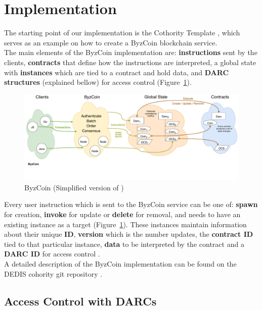 \section{Implementation} \label{Implementation}

The starting point of our implementation is the Cothority Template \cite{Template}, which serves as an example on how to create a ByzCoin \cite{ByzCoin} blockchain service.\\
\newline
The main elements of the ByzCoin implementation are: \textbf{instructions} sent by the clients, \textbf{contracts} that define how the instructions are interpreted, a global state with \textbf{instances} which are tied to a contract and hold data, and \textbf{DARC structures} (explained bellow) for access control (Figure~\ref{ByzCoin simplified}).
\begin{figure}[H]
    \centering
    \includegraphics[width=1\textwidth]{Figures/ByzCoin_simplified.pdf}
    \vspace{-40pt}
    \caption{ByzCoin (Simplified version of \cite{ByzCoin Figure})}
    \label{ByzCoin simplified}
\end{figure}
\noindent
Every user instruction which is sent to the ByzCoin service can be one of: \textbf{spawn} for creation, \textbf{invoke} for update or \textbf{delete} for removal, and needs to have an existing instance as a target (Figure~\ref{ByzCoin simplified}). These instances maintain information about their unique \textbf{ID}, \textbf{version} which is the number updates, the \textbf{contract ID} tied to that particular instance, \textbf{data} to be interpreted by the contract and a \textbf{DARC ID} for access control \cite{Contracts}.\\
\newline
A detailed description of the ByzCoin implementation can be found on the DEDIS cohority git repository \cite{ByzCoin Impl}.

\subsection{Access Control with DARCs} \label{DARCs}

